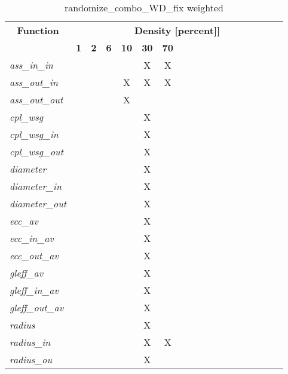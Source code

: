 \begin{table}[h] \centering \begin{tabular}{|l|c|c|c|c|c|c|} \hline\multicolumn{1}{|c|}{\textbf{\large{Function}}} & \multicolumn{17}{c|}{\large{\textbf{Density [percent]]}}}\\\cline{2-18}  & \textbf{1} &  \textbf{2} &  \textbf{6} &  \textbf{10} &  \textbf{30} &  \textbf{70} \\ \hline   \textit{ass\_in\_in} &   &   &   &   & X & X \\ \hline  \textit{ass\_out\_in} &   &   &   & X & X & X \\ \hline  \textit{ass\_out\_out} &   &   &   & X &   &   \\ \hline  \textit{cpl\_wsg} &   &   &   &   & X &   \\ \hline  \textit{cpl\_wsg\_in} &   &   &   &   & X &   \\ \hline  \textit{cpl\_wsg\_out} &   &   &   &   & X &   \\ \hline  \textit{diameter} &   &   &   &   & X &   \\ \hline  \textit{diameter\_in} &   &   &   &   & X &   \\ \hline  \textit{diameter\_out} &   &   &   &   & X &   \\ \hline  \textit{ecc\_av} &   &   &   &   & X &   \\ \hline  \textit{ecc\_in\_av} &   &   &   &   & X &   \\ \hline  \textit{ecc\_out\_av} &   &   &   &   & X &   \\ \hline  \textit{gleff\_av} &   &   &   &   & X &   \\ \hline  \textit{gleff\_in\_av} &   &   &   &   & X &   \\ \hline  \textit{gleff\_out\_av} &   &   &   &   & X &   \\ \hline  \textit{radius} &   &   &   &   & X &   \\ \hline  \textit{radius\_in} &   &   &   &   & X & X \\ \hline  \textit{radius\_ou} &   &   &   &   & X &   \\ \hline \end{tabular}\caption{randomize\_combo\_WD\_fix weighted}\label{tab:my_label} \end{table}